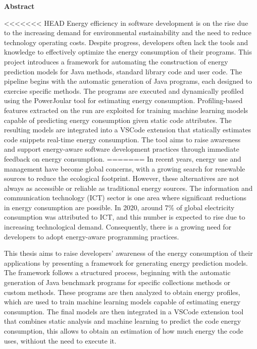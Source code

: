 \vspace*{2cm}
\begin{center}
\Large \bf Abstract
\end{center}
\vspace*{1cm} \setlength{\baselineskip}{0.6cm}

<<<<<<< HEAD
  Energy efficiency in software development is on the rise due to the increasing demand for environmental sustainability and the need to reduce technology operating costs. Despite progress, developers often lack the tools and knowledge to effectively optimize the energy consumption of their programs. 
  This project introduces a framework for automating the construction of energy prediction models for Java methods, standard library code and user code. The pipeline begins with the automatic generation of Java programs, each designed to exercise specific methods. The programs are executed and dynamically profiled using the PowerJoular tool for estimating energy consumption. Profiling-based features extracted on the run are exploited for training machine learning models capable of predicting energy consumption given static code attributes. The resulting models are integrated into a VSCode extension that statically estimates code snippets real-time energy consumption. The tool aims to raise awareness and support energy-aware software development practices through immediate feedback on energy consumption.
=======
In recent years, energy use and management have become global concerns, with a growing search for renewable sources to reduce the ecological footprint. However, these alternatives are not always as accessible or reliable as traditional energy sources. The information and communication technology (ICT) sector is one area where significant reductions in energy consumption are possible. In 2020, around 7\% of global electricity consumption was attributed to ICT, and this number is expected to rise due to increasing technological demand. Consequently, there is a growing need for developers to adopt energy-aware programming practices.

This thesis aims to raise developers’ awareness of the energy consumption of their applications by presenting a framework for generating energy prediction models. The framework follows a structured process, beginning with the automatic generation of Java benchmark programs for specific collections methods or custom methods. These programs are then analyzed to obtain energy profiles, which are used to train machine learning models capable of estimating energy consumption. The final models are then integrated in a VSCode extension tool that combines static analysis and machine learning to predict the code energy consumption, this allows to obtain an estimation of how much energy the code uses, withiout the need to execute it.

